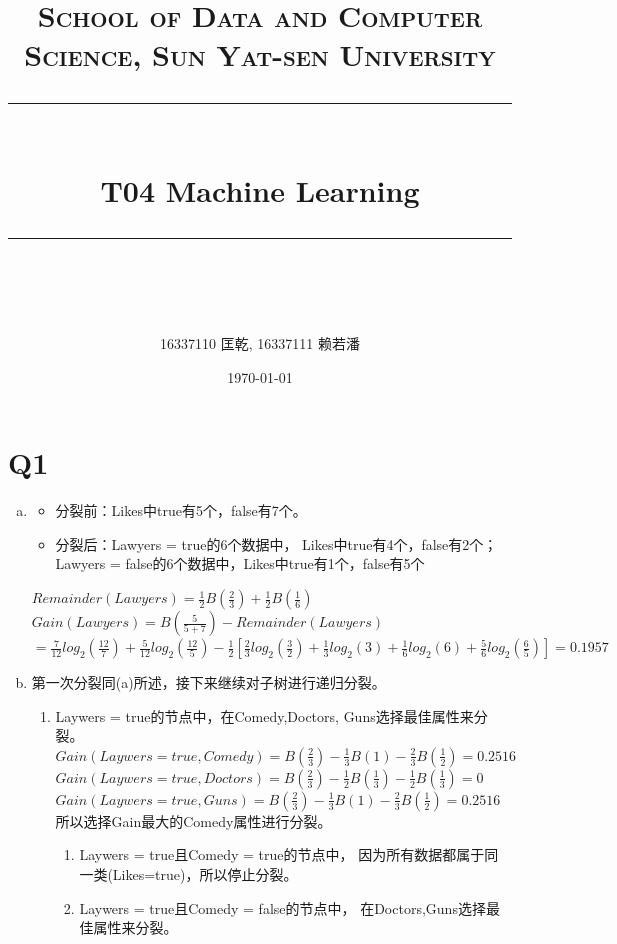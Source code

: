 \documentclass[a4paper, 11pt]{article}
\title{
\normalfont \normalsize
\textsc{School of Data and Computer Science, Sun Yat-sen University} \\ [25pt] %
\rule{\textwidth}{0.5pt} \\[0.4cm] %
\huge  T04 Machine Learning\\ %
\rule{\textwidth}{2pt} \\[0.5cm] %
\author{16337110 匡乾, 16337111 赖若潘}
\date{\normalsize\today}
}
\begin{document}
\maketitle
\tableofcontents
\newpage
\section{Q1}
\begin{enumerate}[(a)]
  \item
  \begin{itemize}
    \item 分裂前：Likes中true有5个，false有7个。
    \item 分裂后：Lawyers = true的6个数据中，
    Likes中true有4个，false有2个；\\
    Lawyers = false的6个数据中，Likes中true有1个，false有5个
  \end{itemize}
  $Remainder(Lawyers) = \frac{1}{2}B(\frac{2}{3}) + \frac{1}{2}B(\frac{1}{6})$\\
  $Gain(Lawyers) = B(\frac{5}{5+7}) - Remainder(Lawyers)$\\
  $= \frac{7}{12}log_2(\frac{12}{7})+
                \frac{5}{12}log_2(\frac{12}{5})-
                \frac{1}{2}[\frac{2}{3}log_2(\frac{3}{2})+\frac{1}{3}log_2(3)
                +\frac{1}{6}log_2(6)+\frac{5}{6}log_2(\frac{6}{5})]
                = 0.1957$
  \item
  第一次分裂同(a)所述，接下来继续对子树进行递归分裂。
  \begin{enumerate}[(1)]
    \item Laywers = true的节点中，在Comedy,Doctors,
    Guns选择最佳属性来分裂。\\
    $Gain(Laywers=true,Comedy) = B(\frac{2}{3})-
    \frac{1}{3}B(1)-\frac{2}{3}B(\frac{1}{2}) = 0.2516$\\
    $Gain(Laywers=true,Doctors) = B(\frac{2}{3})-
    \frac{1}{2}B(\frac{1}{3})-\frac{1}{2}B(\frac{1}{3}) = 0$\\
    $Gain(Laywers=true,Guns) = B(\frac{2}{3})-
    \frac{1}{3}B(1)-\frac{2}{3}B(\frac{1}{2}) = 0.2516$\\
    所以选择Gain最大的Comedy属性进行分裂。
      \begin{enumerate}
        \item Laywers = true且Comedy = true的节点中，
        因为所有数据都属于同一类(Likes=true)，所以停止分裂。
        \item Laywers = true且Comedy = false的节点中，
        在Doctors,Guns选择最佳属性来分裂。\\

\end{enumerate}
\end{enumerate}
\end{enumerate}
\end{document}
